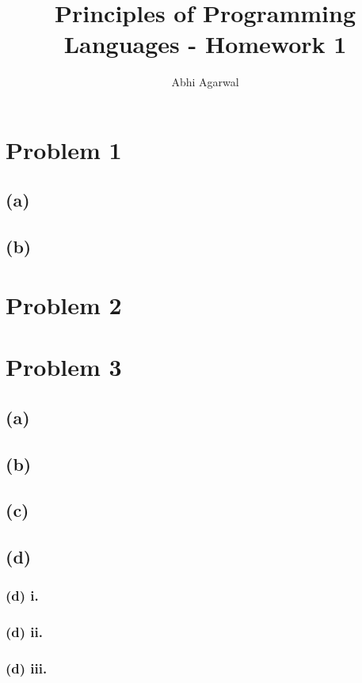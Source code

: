 \documentclass[11pt, oneside]{article}
\title{Principles of Programming Languages - Homework 1}
\author{Abhi Agarwal}
\date{}
\begin{document}
\maketitle
\section{Problem 1}

\subsection*{(a)}
\par

\subsection*{(b)}
\par

\section{Problem 2}
\par

\section{Problem 3}

\subsection*{(a)}
\par

\subsection*{(b)}
\par

\subsection*{(c)}
\par

\subsection*{(d)}
\par

\subsubsection*{(d) i.}
\par

\subsubsection*{(d) ii.}
\par

\subsubsection*{(d) iii.}
\par
\end{document}
